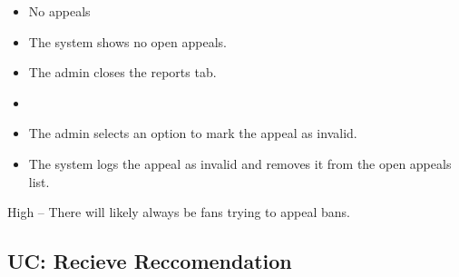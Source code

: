 \documentclass[11pt]{report}
\begin{document}
\begin{description}[leftmargin=2.2cm, style=nextline]
\begin{enumerate}
    \end{enumerate}
  \item[Extensions]
    \begin{itemize}
      \item[1a.]No appeals
        \item The system shows no open appeals.
        \item The admin closes the reports tab.
      \item[5a. Appeal is invalid]
        \item The admin selects an option to mark the appeal as invalid.
        \item The system logs the appeal as invalid and removes it from the open appeals list.
    \end{itemize}
  \item[Frequency of Occurrence] High -- There will likely always be fans trying to appeal bans.
\end{description}


\subsection{UC: Recieve Reccomendation}
\end{document}
